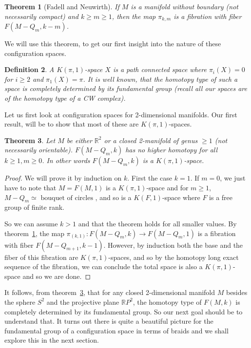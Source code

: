 \documentclass{amsart}
\newtheorem{thm}{Theorem}[section]
\newtheorem{defn}[thm]{Definition}
\newcommand{\pikm}{\pi_{k,m}}
\begin{document}
\begin{thm}[Fadell and Neuwirth]
\label{thm: fib}
If $M$ is a manifold without boundary (not necessarily compact) and $k \geq
m \geq 1$, then the map $\pikm$ is a fibration with fiber $F(M - Q_m, k-m)$.
\end{thm}

We will use this theorem, to get our first insight into the nature of
these configuration spaces. 

\begin{defn}
A $K(\pi,1)$-space $X$ is a path connected space 
where $\pi_i(X)=0$ for $i \geq 2$ and 
$\pi_1(X)=\pi$. It is well known, that the homotopy type of such a space
is completely determined by its fundamental group (recall all our
spaces are of the homotopy type of a CW complex).
\end{defn}

Let us first look at configuration spaces
for 2-dimensional manifolds. 
Our first result, will be to show that most of these are
$K(\pi,1)$-spaces. 

\begin{thm}
\label{thm: Kpi1}
Let $M$ be either $\mathbb{R}^2$ or a closed 2-manifold of genus $\geq 1$
(not necessarily orientable).
$F(M - Q_m,k)$ has no higher homotopy for all $k \geq 1, m \geq 0$.
In other words $F(M - Q_m,k)$ is a $K(\pi,1)$-space.
\end{thm}
\begin{proof}
We will prove it by induction on $k$. First the case $k=1$. If $m=0$,
we just have to note 
that $M=F(M,1)$ is a $K(\pi,1)$-space and for 
$m \geq 1$, $M - Q_m \simeq \text{ bouquet of circles }$,
and so is a $K(F, 1)$-space where $F$ is a free group of finite rank.

So we can assume $k > 1$ and that the theorem holds for all smaller values. 
By theorem~\ref{thm: fib}, the map $\pi_{(k,1)} : F(M - Q_m, k)
\rightarrow F(M - Q_m, 1)$ is a fibration with fiber
$F(M - Q_{m+1}, k-1)$. However, by induction both the base
and the fiber of this fibration are $K(\pi,1)$-spaces, and so by the homotopy
long exact sequence of the fibration, we can conclude the total space
is also a $K(\pi,1)$-space and so we are done.

\end{proof}

It follows, from theorem~\ref{thm: Kpi1}, that for any closed 2-dimensional
manifold $M$ besides the sphere $S^2$ and the projective plane $\mathbb{R}P^2$,
the homotopy type of $F(M,k)$ is completely determined by its fundamental 
group. So our next goal should be to understand that. It turns out there
is quite a beautiful picture for the fundamental group of a configuration
space in terms of braids and we shall explore this in the next section. 
\end{document}
